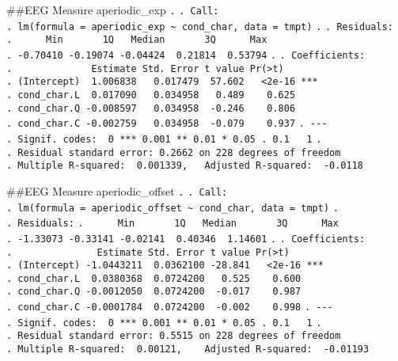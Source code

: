 \documentclass[
]{article}
\begin{document}
\#\#EEG Measure aperiodic\_exp \texttt{.} \texttt{.\ Call:}
\texttt{.\ lm(formula\ =\ aperiodic\_exp\ \textasciitilde{}\ cond\_char,\ data\ =\ tmpt)}
\texttt{.} \texttt{.\ Residuals:}
\texttt{.\ \ \ \ \ \ Min\ \ \ \ \ \ \ 1Q\ \ \ Median\ \ \ \ \ \ \ 3Q\ \ \ \ \ \ Max}
\texttt{.\ -0.70410\ -0.19074\ -0.04424\ \ 0.21814\ \ 0.53794}
\texttt{.} \texttt{.\ Coefficients:}
\texttt{.\ \ \ \ \ \ \ \ \ \ \ \ \ \ Estimate\ Std.\ Error\ t\ value\ Pr(\textgreater{}\textbar{}t\textbar{})}
\texttt{.\ (Intercept)\ \ 1.006838\ \ \ 0.017479\ \ 57.602\ \ \ \textless{}2e-16\ ***}
\texttt{.\ cond\_char.L\ \ 0.017090\ \ \ 0.034958\ \ \ 0.489\ \ \ \ 0.625}
\texttt{.\ cond\_char.Q\ -0.008597\ \ \ 0.034958\ \ -0.246\ \ \ \ 0.806}
\texttt{.\ cond\_char.C\ -0.002759\ \ \ 0.034958\ \ -0.079\ \ \ \ 0.937}
\texttt{.\ -\/-\/-}
\texttt{.\ Signif.\ codes:\ \ 0\ \textquotesingle{}***\textquotesingle{}\ 0.001\ \textquotesingle{}**\textquotesingle{}\ 0.01\ \textquotesingle{}*\textquotesingle{}\ 0.05\ \textquotesingle{}.\textquotesingle{}\ 0.1\ \textquotesingle{}\ \textquotesingle{}\ 1}
\texttt{.}
\texttt{.\ Residual\ standard\ error:\ 0.2662\ on\ 228\ degrees\ of\ freedom}
\texttt{.\ Multiple\ R-squared:\ \ 0.001339,\ \ \ Adjusted\ R-squared:\ \ -0.0118}

\#\#EEG Measure aperiodic\_offset \texttt{.} \texttt{.\ Call:}
\texttt{.\ lm(formula\ =\ aperiodic\_offset\ \textasciitilde{}\ cond\_char,\ data\ =\ tmpt)}
\texttt{.} \texttt{.\ Residuals:}
\texttt{.\ \ \ \ \ \ Min\ \ \ \ \ \ \ 1Q\ \ \ Median\ \ \ \ \ \ \ 3Q\ \ \ \ \ \ Max}
\texttt{.\ -1.33073\ -0.33141\ -0.02141\ \ 0.40346\ \ 1.14601}
\texttt{.} \texttt{.\ Coefficients:}
\texttt{.\ \ \ \ \ \ \ \ \ \ \ \ \ \ \ Estimate\ Std.\ Error\ t\ value\ Pr(\textgreater{}\textbar{}t\textbar{})}
\texttt{.\ (Intercept)\ -1.0443211\ \ 0.0362100\ -28.841\ \ \ \textless{}2e-16\ ***}
\texttt{.\ cond\_char.L\ \ 0.0380368\ \ 0.0724200\ \ \ 0.525\ \ \ \ 0.600}
\texttt{.\ cond\_char.Q\ -0.0012050\ \ 0.0724200\ \ -0.017\ \ \ \ 0.987}
\texttt{.\ cond\_char.C\ -0.0001784\ \ 0.0724200\ \ -0.002\ \ \ \ 0.998}
\texttt{.\ -\/-\/-}
\texttt{.\ Signif.\ codes:\ \ 0\ \textquotesingle{}***\textquotesingle{}\ 0.001\ \textquotesingle{}**\textquotesingle{}\ 0.01\ \textquotesingle{}*\textquotesingle{}\ 0.05\ \textquotesingle{}.\textquotesingle{}\ 0.1\ \textquotesingle{}\ \textquotesingle{}\ 1}
\texttt{.}
\texttt{.\ Residual\ standard\ error:\ 0.5515\ on\ 228\ degrees\ of\ freedom}
\texttt{.\ Multiple\ R-squared:\ \ 0.00121,\ \ \ \ Adjusted\ R-squared:\ \ -0.01193}
\end{document}

